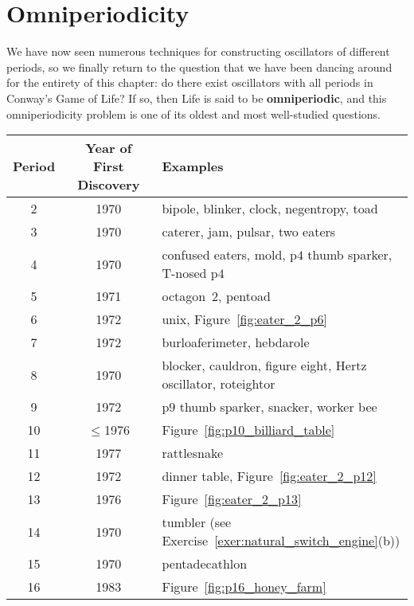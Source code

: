 \section{Omniperiodicity}\label{sec:omniperiodic}

We have now seen numerous techniques for constructing oscillators of different periods, so we finally return to the question that we have been dancing around for the entirety of this chapter: do there exist oscillators with all periods in Conway's Game of Life? If so, then Life is said to be \textbf{omniperiodic}, and this omniperiodicity problem is one of its oldest and most well-studied questions.

\begingroup\renewcommand{\arraystretch}{0.99}
\begin{table}[!ptb]\vspace*{0.05in}
	\begin{center}		
		\begin{tabular}{c c l}
			\toprule
			Period & Year of First Discovery & Examples \\ \midrule
			2 & 1970 & bipole, blinker, clock, negentropy, toad \\
			\rowcolor{gray!20} 3 & 1970 & caterer, jam, pulsar, two eaters \\
			4 & 1970 & confused eaters, mold, p$4$ thumb sparker, T-nosed p$4$ \\
			\rowcolor{gray!20} 5 & 1971 & octagon~2, pentoad \\
			6 & 1972 & unix, Figure~\ref{fig:eater_2_p6} \\
			\rowcolor{gray!20} 7 & 1972 & burloaferimeter, hebdarole \\
			8 & 1970 & blocker, cauldron, figure eight, Hertz oscillator, roteightor \\
			\rowcolor{gray!20} 9 & 1972 & p$9$ thumb sparker, snacker, worker bee \\
			10 & $\leq$1976 & Figure~\ref{fig:p10_billiard_table} \\
			\rowcolor{gray!20} 11 & 1977 & rattlesnake \\
			12 & 1972 & dinner table, Figure~\ref{fig:eater_2_p12} \\
			\rowcolor{gray!20} 13 & 1976 & Figure~\ref{fig:eater_2_p13} \\
			14 & 1970 & tumbler (see Exercise~\ref{exer:natural_switch_engine}(b)) \\
			\rowcolor{gray!20} 15 & 1970 & pentadecathlon \\
			16 & 1983 & Figure~\ref{fig:p16_honey_farm} \\

\end{tabular}
\end{center}
\end{table}
